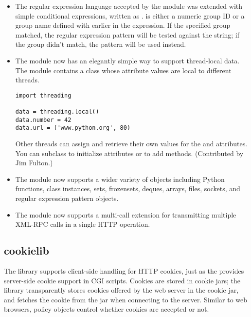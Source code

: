 \documentclass{howto}
\begin{document}
\begin{itemize}
\item The regular expression language accepted by the  module
   was extended with simple conditional expressions, written as
   .   is either a
   numeric group ID or a group name defined with  
   earlier in the expression.  If the specified group matched, the
   regular expression pattern  will be tested against the string; if
   the group didn't match, the pattern  will be used instead.


\item The  module now has an elegantly simple way to support 
thread-local data.  The module contains a  class whose
attribute values are local to different threads.

\begin{verbatim}
import threading

data = threading.local()
data.number = 42
data.url = ('www.python.org', 80)
\end{verbatim}

Other threads can assign and retrieve their own values for the
 and  attributes.  You can subclass
 to initialize attributes or to add methods.
(Contributed by Jim Fulton.)

\item The  module now supports a wider variety of objects
   including Python functions, class instances, sets, frozensets, deques,
   arrays, files, sockets, and regular expression pattern objects.

\item The  module now supports a multi-call extension for 
transmitting multiple XML-RPC calls in a single HTTP operation.
   
\end{itemize}



\subsection{cookielib}

The  library supports client-side handling for HTTP
cookies, just as the  provides server-side cookie
support in CGI scripts. Cookies are stored in cookie jars; the library
transparently stores cookies offered by the web server in the cookie
jar, and fetches the cookie from the jar when connecting to the
server. Similar to web browsers, policy objects control whether
cookies are accepted or not.
\end{document}
